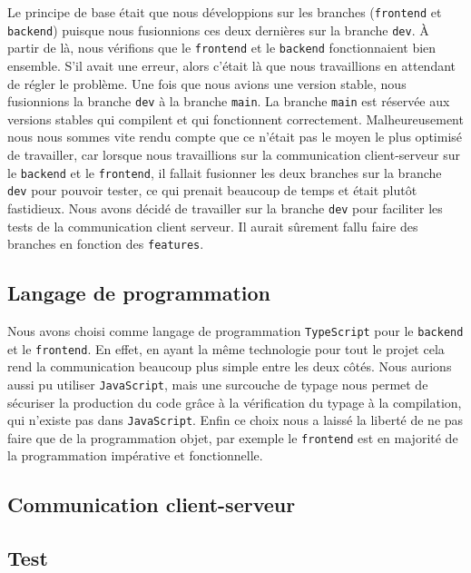 Le principe de base était que nous développions sur les branches (\lstinline{frontend} et \lstinline{backend}) puisque nous fusionnions ces deux dernières sur la branche \lstinline{dev}.
À partir de là, nous vérifions que le {\tt frontend} et le {\tt backend} fonctionnaient bien ensemble.
S'il avait une erreur, alors c'était là que nous travaillions en attendant de régler le problème.
Une fois que nous avions une version stable, nous fusionnions la branche \lstinline{dev} à la branche \lstinline{main}.
La branche {\tt main} est réservée aux versions stables qui compilent et qui fonctionnent correctement.
Malheureusement nous nous sommes vite rendu compte que ce n'était pas le moyen le plus optimisé de travailler, car lorsque nous travaillions sur la communication client-serveur sur le \lstinline{backend} et le \lstinline{frontend}, il fallait fusionner les deux branches sur la branche \lstinline{dev} pour pouvoir tester, ce qui prenait beaucoup de temps et était plutôt fastidieux.
Nous avons décidé de travailler sur la branche \lstinline{dev} pour faciliter les tests de la communication client serveur.
Il aurait sûrement fallu faire des branches en fonction des {\tt features}.

\subsection{Langage de programmation}

Nous avons choisi comme langage de programmation \lstinline{TypeScript} pour le \lstinline{backend} et le \lstinline{frontend}. En effet, en ayant la même technologie pour tout le projet cela rend la communication beaucoup plus simple entre les deux côtés.
Nous aurions aussi pu utiliser \lstinline{JavaScript}, mais une surcouche de typage nous permet de sécuriser la production du code grâce à la vérification du typage à la compilation, qui n'existe pas dans \lstinline{JavaScript}.
Enfin ce choix nous a laissé la liberté de ne pas faire que de la programmation objet, par exemple le \lstinline{frontend} est en majorité de la programmation impérative et fonctionnelle.

\subsection{Communication client-serveur}



\subsection{Test}

